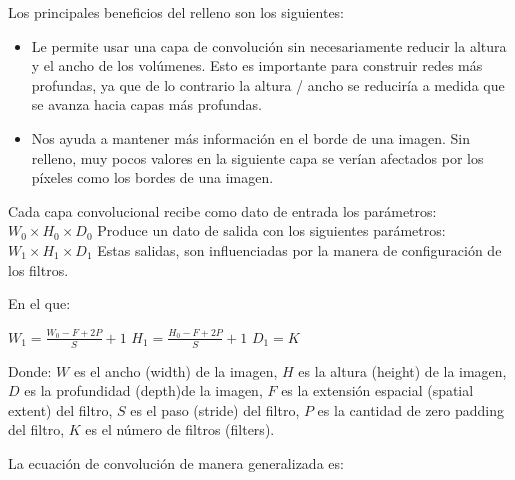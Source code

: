 \begin{enumerate}
				Los principales beneficios del relleno son los siguientes:
				\begin{itemize}
				\item Le permite usar una capa de convolución sin necesariamente reducir la altura y el ancho de los volúmenes. Esto es importante para construir redes más profundas, ya que de lo contrario la altura / ancho se reduciría a medida que se avanza hacia capas más profundas.
				\item Nos ayuda a mantener más información en el borde de una imagen. Sin relleno, muy pocos valores en la siguiente capa se verían afectados por los píxeles como los bordes de una imagen.
				\end{itemize}
			
		\end{enumerate}

		\noindent Cada capa convolucional recibe como dato de entrada los parámetros:
		${W_{0}}\times{H_{0}}\times{D_{0}}$ \newline
		Produce un dato de salida con los siguientes parámetros: ${W_{1}}\times{H_{1}}\times{D_{1}}$\newline
		Estas salidas, son influenciadas por la manera de configuración de los filtros.\newline
		\vspace{-2em} 
		
		\begin{minipage}[t]{0.5\textwidth}
		En el que:
		\begingroup\makeatletter\def\f@size{12.4}\check@mathfonts
		\begin{center}
		 ${W_{1}} = \frac{{W_{0}} - F + 2P}{S} +1$ 
		\vskip 0.4cm 
		 ${H_{1}} = \frac{{H_{0}} - F + 2P}{S} +1$ 
		\vskip 0.4cm 
		 ${D_{1}} = K$ 
		 \end{center}
		\endgroup
		\end{minipage}
		\begin{minipage}[t]{0.55\textwidth}
		Donde:
		\vskip 0.1cm 
		$W$ es el ancho (width) de la imagen, \vskip 0.4cm  
		$H$ es la altura (height) de la imagen,\vskip 0.4cm 
		$D$ es la profundidad (depth)de la imagen,\vskip 0.4cm 
		$F$ es la extensión espacial (spatial extent) del filtro,\vskip 0.4cm 
		$S$ es el paso (stride) del filtro,\vskip 0.4cm 
		$P$ es la cantidad de zero padding del filtro,\vskip 0.4cm 
		$K$ es el número de filtros (filters).\vskip 0.4cm 
		\end{minipage}
		\vskip 0.4cm 
		\noindent La ecuación de convolución de manera generalizada es:
		
